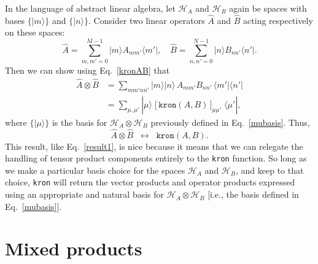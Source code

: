\documentclass[prx,12pt]{revtex4-2}
\begin{document}
In the language of abstract linear algebra, let $\mathscr{H}_A$ and
$\mathscr{H}_B$ again be spaces with bases $\{|m\rangle\}$ and
$\{|n\rangle\}$.  Consider two linear operators $\hat{A}$ and
$\hat{B}$ acting respectively on these spaces:
\begin{equation}
  \hat{A} = \sum_{m,m'=0}^{M-1}  |m\rangle A_{mm'} \langle m'|, \quad \hat{B} = \sum_{n,n'=0}^{N-1} |n\rangle B_{nn'}\langle n'|.
\end{equation}
Then we can show using Eq.~\eqref{kronAB} that
\begin{align}
  \hat{A}\otimes\hat{B} &=
  \sum_{mm'nn'} |m\rangle|n\rangle\,A_{mm'} B_{nn'}\,\langle m'| \langle n'| \\
  &= \sum_{\mu,\mu'} |\mu\rangle \;
  \big[\,\texttt{kron}(A,B)\,\big]_{\mu\mu'} \; \langle\mu'|,
\end{align}
where $\big\{|\mu\rangle\big\}$ is the basis for
$\mathscr{H}_A\otimes\mathscr{H}_B$ previously defined in
Eq.~\eqref{mubasis}.  Thus,
\begin{equation}
  \hat{A}\otimes\hat{B} \;\;\leftrightarrow\;\;
  \texttt{kron}(A,B).
  \label{result2}
\end{equation}
This result, like Eq.~\eqref{result1}, is nice because it means that
we can relegate the handling of tensor product components entirely to
the \texttt{kron} function.  So long as we make a particular basis
choice for the spaces $\mathscr{H}_A$ and $\mathscr{H}_B$, and keep to
that choice, \texttt{kron} will return the vector products and
operator products expressed using an appropriate and natural basis for
$\mathscr{H}_A\otimes\mathscr{H}_B$ [i.e., the basis defined in
  Eq.~\eqref{mubasis}].

\section{Mixed products}
\end{document}
